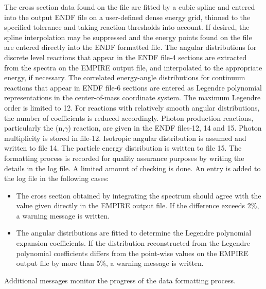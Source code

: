 \documentclass[twocolumn,amsmath,amssymb,10pt,groupedaddress,a4paper]{revtex4}
\begin{document}
The cross section data found on the file are fitted by a cubic spline
and entered into the output ENDF file  on a user-defined
dense energy grid, thinned to the specified tolerance and taking reaction
thresholds into account. If desired, the spline interpolation may
be suppressed and the energy points found on the file are entered
directly into the ENDF formatted file.
The angular distributions for discrete level reactions that appear
in the ENDF file-4 sections are extracted from the spectra on the
EMPIRE output file, and interpolated to the appropriate
energy, if necessary.
The correlated energy-angle distributions for continuum reactions
that appear in ENDF file-6 sections are entered as Legendre polynomial
representations in the center-of-mass coordinate system. The maximum
Legendre order is limited to 12. For reactions with relatively smooth
angular distributions, the number of coefficients is reduced accordingly.
Photon production reactions, particularly
the (n,$\gamma$) reaction, are given in the ENDF files-12, 14 and
15. Photon multiplicity is stored in file-12. Isotropic angular distribution
is assumed and written to file 14. The particle energy distribution
is written to file 15.
The formatting process is recorded for quality assurance purposes
by writing the details in the log file. A limited amount
of checking is done. An entry is added to the log file in the following
cases:
\begin{itemize}
\item The cross section obtained by integrating the spectrum should agree
with the value given directly in the EMPIRE output file.
If the difference exceeds 2\%, a warning message is written.
\item The angular distributions are fitted to determine the Legendre polynomial
expansion coefficients. If the distribution reconstructed from the
Legendre polynomial coefficients differs from the point-wise values
on the EMPIRE output file by more than 5\%, a warning message is written.
\end{itemize}
Additional messages monitor the progress of the data formatting process.
\end{document}
